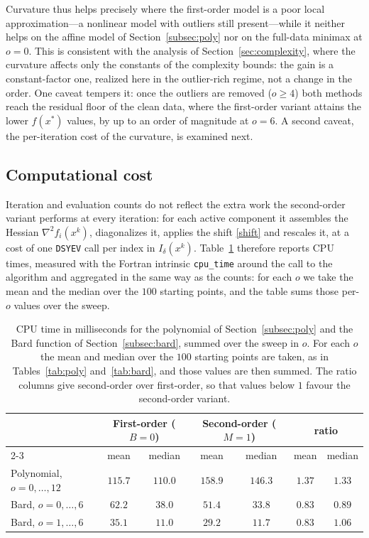 \documentclass[11pt]{article}
\newcounter{alg}[section]
\begin{document}
Curvature thus helps precisely where the first-order model is a poor local
approximation---a nonlinear model with outliers still present---while it neither
helps on the affine model of Section~\ref{subsec:poly} nor on the full-data
minimax at $o = 0$. This is consistent with the analysis of
Section~\ref{sec:complexity}, where the curvature affects only the constants of the
complexity bounds: the gain is a constant-factor one, realized here in the
outlier-rich regime, not a change in the order. One caveat tempers it: once the
outliers are removed ($o \ge 4$) both
methods reach the residual floor of the clean data, where the first-order
variant attains the lower $f(x^*)$ values, by up to an order of magnitude at
$o = 6$. A second caveat, the per-iteration cost of the curvature, is examined
next.

\subsection{Computational cost} \label{subsec:time}

Iteration and evaluation counts do not reflect the extra work the second-order
variant performs at every iteration: for each active component it assembles the
Hessian $\nabla^2 f_i(x^k)$, diagonalizes it, applies the shift \eqref{shift}
and rescales it, at a cost of one \texttt{DSYEV} call per index in
$I_\delta(x^k)$. Table~\ref{tab:time} therefore reports CPU times, measured with
the Fortran intrinsic \texttt{cpu\_time} around the call to the algorithm and
aggregated in the same way as the counts: for each $o$ we take the mean and the
median over the $100$ starting points, and the table sums those per-$o$ values
over the sweep.

\begin{table}[ht!]
\centering
\begin{tabular}{l cc cc cc}
\hline
 & \multicolumn{2}{c}{First-order ($B=0$)}
 & \multicolumn{2}{c}{Second-order ($M=1$)}
 & \multicolumn{2}{c}{ratio} \\
\cline{2-3}\cline{4-5}\cline{6-7}
 & mean & median & mean & median & mean & median \\
\hline
Polynomial, $o=0,\dots,12$
  & $115.7$ & $110.0$ & $158.9$ & $146.3$ & $1.37$ & $1.33$ \\
Bard, $o=0,\dots,6$
  & $62.2$  & $38.0$  & $51.4$  & $33.8$  & $0.83$ & $0.89$ \\
Bard, $o=1,\dots,6$
  & $35.1$  & $11.0$  & $29.2$  & $11.7$  & $0.83$ & $1.06$ \\
\hline
\end{tabular}
\caption{CPU time in milliseconds for the polynomial of
Section~\ref{subsec:poly} and the Bard function of Section~\ref{subsec:bard},
summed over the sweep in $o$. For each $o$
the mean and median over the $100$ starting points are taken, as in
Tables~\ref{tab:poly} and~\ref{tab:bard}, and those values are then summed. The
ratio columns give second-order over first-order, so that values below $1$
favour the second-order variant.}
\label{tab:time}
\end{table}
\end{document}
